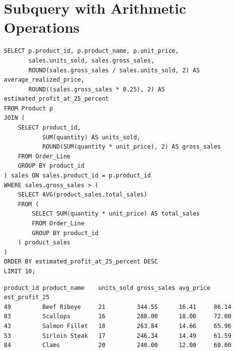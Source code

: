 \section{Subquery with Arithmetic Operations}

{\scriptsize
\begin{verbatim}
SELECT p.product_id, p.product_name, p.unit_price,
       sales.units_sold, sales.gross_sales,
       ROUND(sales.gross_sales / sales.units_sold, 2) AS average_realized_price,
       ROUND((sales.gross_sales * 0.25), 2) AS estimated_profit_at_25_percent
FROM Product p
JOIN (
    SELECT product_id,
           SUM(quantity) AS units_sold,
           ROUND(SUM(quantity * unit_price), 2) AS gross_sales
    FROM Order_Line
    GROUP BY product_id
) sales ON sales.product_id = p.product_id
WHERE sales.gross_sales > (
    SELECT AVG(product_sales.total_sales)
    FROM (
        SELECT SUM(quantity * unit_price) AS total_sales
        FROM Order_Line
        GROUP BY product_id
    ) product_sales
)
ORDER BY estimated_profit_at_25_percent DESC
LIMIT 10;
\end{verbatim}
}

{\scriptsize
\begin{verbatim}
product_id product_name    units_sold gross_sales avg_price est_profit_25
49         Beef Ribeye     21         344.55      16.41     86.14
83         Scallops        16         288.00      18.00     72.00
43         Salmon Fillet   18         263.84      14.66     65.96
53         Sirloin Steak   17         246.34      14.49     61.59
84         Clams           20         240.00      12.00     60.00
\end{verbatim}
}

